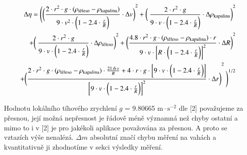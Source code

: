 \documentclass[a4paper]{article}
\begin{document}
\begin{eqnarray*}
\Delta \eta = \Bigg(\bigg({\frac{2 \cdot r^{2} \cdot g  \cdot (\rho_{\textnormal{těleso}} - \rho_{\textnormal{kapalina}})}{ 9 \cdot v^{2} \cdot \bigg(1 - 2.4 \cdot \frac{r}{R} \bigg)} \cdot \Delta v \bigg)}^{2} + \bigg( \:{\frac{2 \cdot r^{2} \cdot g}{ 9 \cdot v \cdot \bigg(1 - 2.4 \cdot \frac{r}{R} \bigg)} \cdot \Delta \rho_{\textnormal{kapalina}} \bigg)}^{2} \\
+ \bigg( \:{\frac{2 \cdot r^{2} \cdot g}{ 9 \cdot v \cdot \bigg(1 - 2.4 \cdot \frac{r}{R} \bigg)} \cdot \Delta \rho_{\textnormal{těleso}} \bigg)}^{2} + \bigg({\frac{4.8 \cdot r^{2} \cdot g  \cdot (\rho_{\textnormal{těleso}} - \rho_{\textnormal{kapalina}}) \cdot r}{9 \cdot v \cdot \bigg[R \cdot  \bigg(1 - 2.4 \cdot \frac{r}{R} \bigg)\bigg]^{2}} \cdot \Delta R \bigg)}^{2} \\
+ \bigg({\frac{2 \cdot r^{2} \cdot g  \cdot (\rho_{\textnormal{těleso}} - \rho_{\textnormal{kapalina}}) \cdot \frac{21.6 \cdot v}{R} + 4 \cdot r \cdot g \cdot \bigg[ 9 \cdot v \cdot \bigg(1 - 2.4 \cdot \frac{r}{R} \bigg)\bigg] }{\bigg[ 9 \cdot v \cdot \bigg(1 - 2.4 \cdot \frac{r}{R} \bigg)\bigg]^{2}} \cdot \Delta r \bigg)}^{2} \:
\Bigg)^{1/2}
\end{eqnarray*}
\par Hodnotu lokálního tíhového zrychlení $g$ = 9.80665 $\mathrm{m \cdot s^{-2}}$ dle [2] považujeme za přesnou, její možná nepřesnost je řádově méně významná než chyby ostatní a mimo to i v [2] je pro jakékoli aplikace považována za přesnou. A proto se vztazích výše nenalézá. $\Delta m$ absolutní značí chybu měření na vahách a kvantitativně ji zhodnotíme v sekci výsledky měření.
\end{document}
